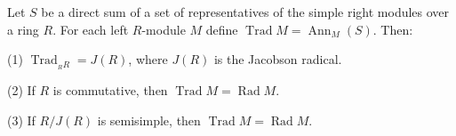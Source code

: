 Let $S$ be a direct sum of a set of representatives of the simple right modules over a ring $R$. For each left $R$-module $M$ define $\operatorname{Trad} M = \operatorname{Ann}_M(S)$. Then:

(1) $\operatorname{Trad}_{{}_R R} = J(R)$, where $J(R)$ is the Jacobson radical.

(2) If $R$ is commutative, then $\operatorname{Trad} M = \operatorname{Rad} M$.

(3) If $R/J(R)$ is semisimple, then $\operatorname{Trad} M = \operatorname{Rad} M$.
